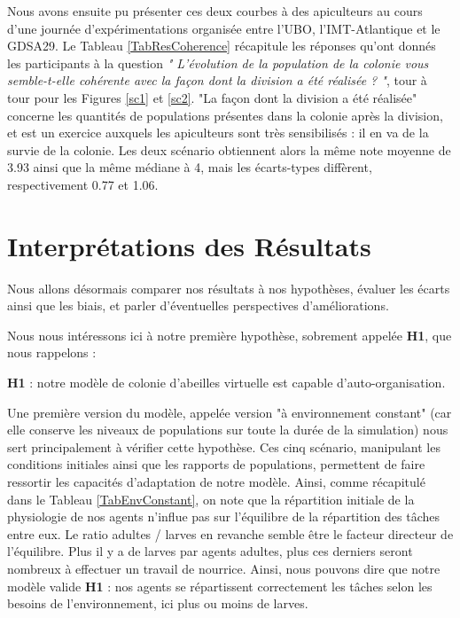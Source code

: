 	Nous avons ensuite pu présenter ces deux courbes à des apiculteurs au cours d'une journée d'expérimentations organisée entre l'UBO, l'IMT-Atlantique et le GDSA29. Le Tableau \ref{TabResCoherence} récapitule les réponses qu'ont donnés les participants à la question \textit{" L'évolution de la population de la colonie vous semble-t-elle cohérente avec la façon dont la division a été réalisée ? "}, tour à tour pour les Figures \ref{sc1} et \ref{sc2}. "La façon dont la division a été réalisée" concerne les quantités de populations présentes dans la colonie après la division, et est un exercice auxquels les apiculteurs sont très sensibilisés : il en va de la survie de la colonie. Les deux scénario obtiennent alors la même note moyenne de 3.93 ainsi que la même médiane à 4, mais les écarts-types diffèrent, respectivement 0.77 et 1.06.
	
	
	\section{Interprétations des Résultats}

	Nous allons désormais comparer nos résultats à nos hypothèses, évaluer les écarts ainsi que les biais, et parler d'éventuelles perspectives d'améliorations.
	
		Nous nous intéressons ici à notre première hypothèse, sobrement appelée \textbf{H1}, que nous rappelons : 
		
		\textbf{H1} : notre modèle de colonie d'abeilles virtuelle est capable d'auto-organisation.
		
		Une première version du modèle, appelée version "à environnement constant" (car elle conserve les niveaux de populations sur toute la durée de la simulation) nous sert principalement à vérifier cette hypothèse. Ces cinq scénario, manipulant les conditions initiales ainsi que les rapports de populations, permettent de faire ressortir les capacités d'adaptation de notre modèle. Ainsi, comme récapitulé dans le Tableau \ref{TabEnvConstant}, on note que la répartition initiale de la physiologie de nos agents n'influe pas sur l'équilibre de la répartition des tâches entre eux. Le ratio adultes / larves en revanche semble être le facteur directeur de l'équilibre. Plus il y a de larves par agents adultes, plus ces derniers seront nombreux à effectuer un travail de nourrice. Ainsi, nous pouvons dire que notre modèle valide \textbf{H1} : nos agents se répartissent correctement les tâches selon les besoins de l'environnement, ici plus ou moins de larves.
		
